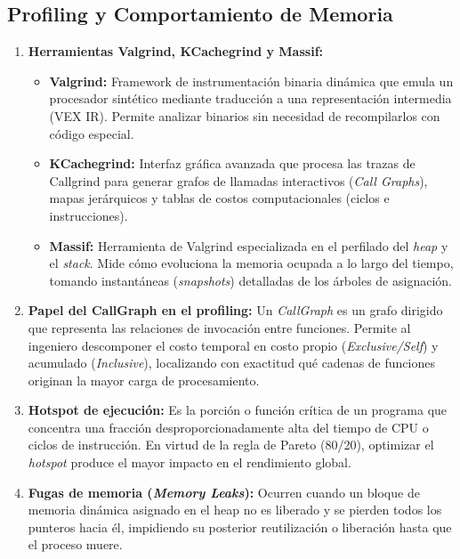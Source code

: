 \documentclass[11pt,a4paper]{article}
\begin{document}
\subsection{Profiling y Comportamiento de Memoria}
\begin{enumerate}[label=\textbf{2.1.\arabic*.}]
    \item \textbf{Herramientas Valgrind, KCachegrind y Massif:}
    \begin{itemize}
        \item \textbf{Valgrind:} Framework de instrumentación binaria dinámica que emula un procesador sintético mediante traducción a una representación intermedia (VEX IR). Permite analizar binarios sin necesidad de recompilarlos con código especial.
        \item \textbf{KCachegrind:} Interfaz gráfica avanzada que procesa las trazas de Callgrind para generar grafos de llamadas interactivos (\textit{Call Graphs}), mapas jerárquicos y tablas de costos computacionales (ciclos e instrucciones).
        \item \textbf{Massif:} Herramienta de Valgrind especializada en el perfilado del \textit{heap} y el \textit{stack}. Mide cómo evoluciona la memoria ocupada a lo largo del tiempo, tomando instantáneas (\textit{snapshots}) detalladas de los árboles de asignación.
    \end{itemize}

    \item \textbf{Papel del CallGraph en el profiling:} Un \textit{CallGraph} es un grafo dirigido que representa las relaciones de invocación entre funciones. Permite al ingeniero descomponer el costo temporal en costo propio (\textit{Exclusive/Self}) y acumulado (\textit{Inclusive}), localizando con exactitud qué cadenas de funciones originan la mayor carga de procesamiento.

    \item \textbf{Hotspot de ejecución:} Es la porción o función crítica de un programa que concentra una fracción desproporcionadamente alta del tiempo de CPU o ciclos de instrucción. En virtud de la regla de Pareto (80/20), optimizar el \textit{hotspot} produce el mayor impacto en el rendimiento global.

    \item \textbf{Fugas de memoria (\textit{Memory Leaks}):} Ocurren cuando un bloque de memoria dinámica asignado en el heap no es liberado y se pierden todos los punteros hacia él, impidiendo su posterior reutilización o liberación hasta que el proceso muere.


\end{enumerate}
\end{document}
